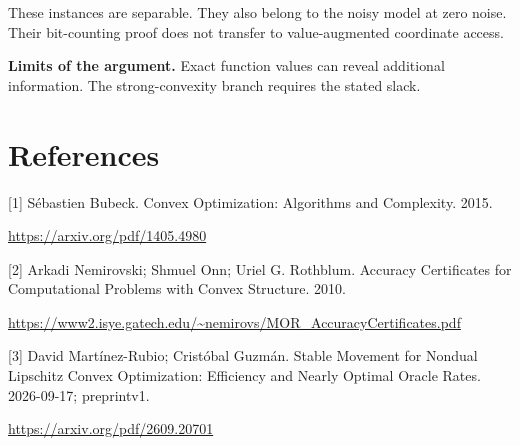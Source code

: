 \documentclass[10pt,a4paper]{article}
\begin{document}
These instances are separable. They also belong to the noisy model at zero noise. Their bit-counting proof does not transfer to value-augmented coordinate access.

\textbf{Limits of the argument.} Exact function values can reveal additional information. The strong-convexity branch requires the stated slack.

\section{References}
[1] Sébastien Bubeck. Convex Optimization: Algorithms and Complexity. 2015.

\url{https://arxiv.org/pdf/1405.4980}

[2] Arkadi Nemirovski; Shmuel Onn; Uriel G. Rothblum. Accuracy Certificates for Computational Problems with Convex Structure. 2010.

\url{https://www2.isye.gatech.edu/~nemirovs/MOR_AccuracyCertificates.pdf}

[3] David Martínez-Rubio; Cristóbal Guzmán. Stable Movement for Nondual Lipschitz Convex Optimization: Efficiency and Nearly Optimal Oracle Rates. 2026-09-17; preprintv1.

\url{https://arxiv.org/pdf/2609.20701}
\end{document}
